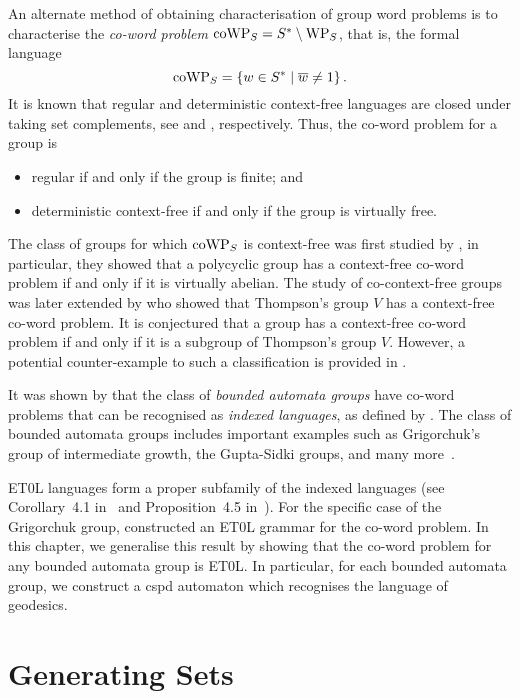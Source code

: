 An alternate method of obtaining characterisation of group word problems is to characterise the \emph{co-word problem} $\mathrm{coWP}_S = S^* \setminus \mathrm{WP}_S$, that is, the formal language
\[
	\mathrm{coWP}_S
	=
	\left\{
		w \in S^*
	\mid
		\overline{w} \neq 1
	\right\}.
\]
It is known that regular and deterministic context-free languages are closed under taking set complements, see \cite[Theorem~8.4]{rich2007} and \cite[Theorem~2.42]{sipser2013}, respectively.
Thus, the co-word problem for a group is
\begin{itemize}
	\item regular if and only if the group is finite; and
	\item deterministic context-free if and only if the group is virtually free.
\end{itemize}
The class of groups for which $\mathrm{coWP}_S$ is context-free was first studied by \textcite{holt2005}, in particular, they showed that a polycyclic group has a context-free co-word problem if and only if it is virtually abelian.
The study of co-context-free groups was later extended by \textcite{lehnert2007} who showed that Thompson's group $V$ has a context-free co-word problem.
It is conjectured \cite[Conjecture~5]{bleak2016} that a group has a context-free co-word problem if and only if it is a subgroup of Thompson's group $V$.
However, a potential counter-example to such a classification is provided in \cite{berns-zieve2014}.

It was shown by \textcite{holt2006} that the class of \emph{bounded automata groups} have co-word problems that can be recognised as \emph{indexed languages}, as defined by \textcite{aho1968}.
The class of bounded automata groups includes important examples such as Grigorchuk's group of intermediate growth, the Gupta-Sidki groups, and many more~\cite{grigorchuk1980,gupta1983,nekrashevych2005,sidki2000}.

ET0L languages form a proper subfamily of the indexed languages (see Corollary~4.1 in~\cite{culik1974} and Proposition~4.5 in~\cite{ehrenfeucht1976}).
For the specific case of the Grigorchuk group, \textcite{ciobanu2018} constructed an ET0L grammar for the co-word problem.
In this chapter, we generalise this result by showing that the co-word problem for any bounded automata group is ET0L.
In particular, for each bounded automata group, we construct a cspd automaton which recognises the language of geodesics.

\section{Generating Sets}\label{sec:background-coword-problems}

